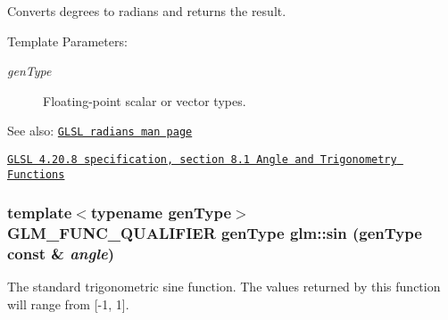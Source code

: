 Converts degrees to radians and returns the result.

\begin{Desc}
\item[Template Parameters:]
\begin{description}
\item[{\em genType}]Floating-point scalar or vector types.\end{description}
\end{Desc}
\begin{Desc}
\item[See also:]\href{http://www.opengl.org/sdk/docs/manglsl/xhtml/radians.xml}{\tt GLSL radians man page} 

\href{http://www.opengl.org/registry/doc/GLSLangSpec.4.20.8.pdf}{\tt GLSL 4.20.8 specification, section 8.1 Angle and Trigonometry Functions} \end{Desc}
\hypertarget{group__core__func__trigonometric_gd4d4eda735d915be9af695fe2b4cded2}{
\subsubsection[sin]{\setlength{\rightskip}{0pt plus 5cm}template$<$typename genType$>$ GLM\_\-FUNC\_\-QUALIFIER genType glm::sin (genType const \& {\em angle})}}
\label{group__core__func__trigonometric_gd4d4eda735d915be9af695fe2b4cded2}


The standard trigonometric sine function. The values returned by this function will range from \mbox{[}-1, 1\mbox{]}.

